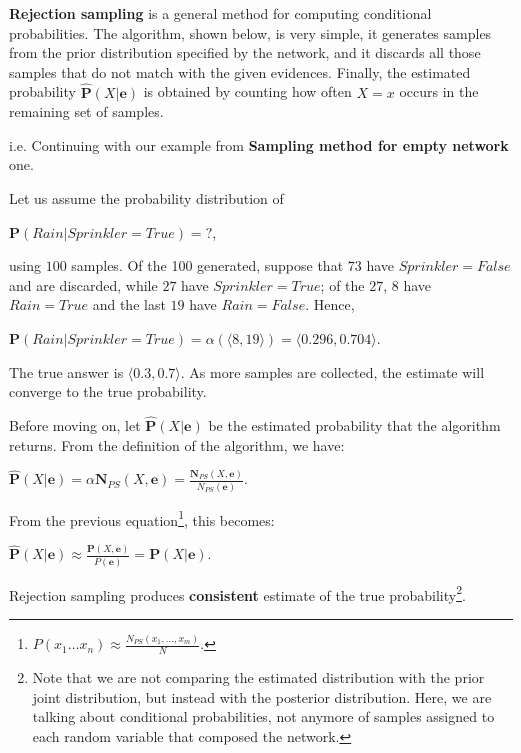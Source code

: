 \textbf{Rejection sampling} is a general method for computing conditional probabilities. The algorithm, shown below, is very simple, it generates samples from the prior 
distribution specified by the network, and it discards all those samples that do not match with the given evidences. Finally, the estimated probability $\hat{\mathbf{P}}(X|\mathbf{e})$
is obtained by counting how often $X = x$ occurs in the remaining set of samples.
\begin{example}
    i.e. Continuing with our example from \textbf{Sampling method for empty network} one. \vspace{3.5pt}

    Let us assume the probability distribution of \vspace{3.5pt}
    \begin{center}
        $\mathbf{P}(Rain|Sprinkler=True) = ?$,
    \end{center} \vspace{3.5pt}
    using $100$ samples. Of the 100 generated, suppose that $73$ have $Sprinkler=False$ and are discarded, while $27$ have $Sprinkler=True$; of the $27$, $8$ have $Rain=True$ 
    and the last $19$ have $Rain=False$. Hence, \vspace{3.5pt}
    \begin{center}
        $\mathbf{P}(Rain|Sprinkler=True) = \alpha(\langle8, 19\rangle) = \langle0.296, 0.704\rangle$.
    \end{center} \vspace{3.5pt}
    The true answer is $\langle0.3, 0.7\rangle$. As more samples are collected, the estimate will converge to the true probability. 
\end{example}
Before moving on, let $\hat{\mathbf{P}}(X|\mathbf{e})$ be the estimated probability that the algorithm returns. From the definition of the algorithm, we have: \vspace{3.5pt}
\begin{center}
    $\hat{\mathbf{P}}(X|\mathbf{e}) = \alpha\mathbf{N}_{PS}(X, \mathbf{e}) = \frac{\mathbf{N}_{PS}(X, \mathbf{e})}{N_{PS}(\mathbf{e})}$.
\end{center} \vspace{3.5pt}
From the previous equation\footnote{$P(x_1 \dots x_n) \approx \frac{N_{PS}(x_1, \dots, x_m)}{N}$.}, this becomes:
\begin{center}
    $\hat{\mathbf{P}}(X|\mathbf{e}) \approx \frac{\mathbf{P}(X, \mathbf{e})}{P(\mathbf{e})} = \mathbf{P}(X|\mathbf{e})$.
\end{center}
Rejection sampling produces \textbf{consistent} estimate of the true probability\footnote{Note that we are not comparing the estimated distribution with the prior joint distribution, but instead with the posterior distribution. Here, we are talking about conditional probabilities, not anymore of samples assigned to each random variable that composed the network.}.

